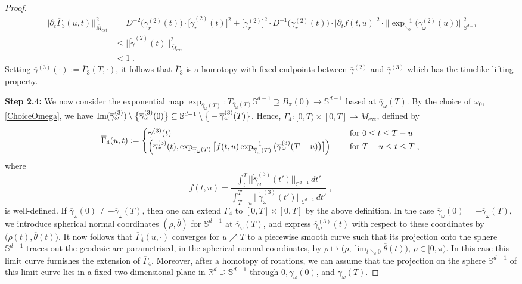 \documentclass[reqno]{article}
\newcommand{\R}{\mathbb{R}}
\newcommand{\Sd}{\mathbb{S}^{d-1}}
\newcommand{\ovg}{\overline{\gamma}}
\newcommand{\oMe}{\overline{M}_\mathrm{ext}}
\begin{document}
\begin{proof}
\begin{equation*}
\begin{split}
||\partial_t\overline{\Gamma}_3(u,t) ||^2_{\oMe} &= D^{-2}\big(\ovg^{(2)}_r(t)\big) \cdot  \big[ \dot{\ovg}_r^{(2)}(t)\big]^2 + \big[\ovg_r^{(2)}\big]^2 \cdot D^{-1}\big(\ovg_r^{(2)}(t)\big) \cdot |\partial_t f(t,u)|^2 \cdot ||\exp^{-1}_{\omega_0}\big( \ovg^{(2)}_\omega(u)\big)||^2_{\Sd} \\
&\leq ||\dot{\ovg}^{(2)}(t)||_{\oMe}^2 \\
&< 1 \;.
\end{split}
\end{equation*}
Setting $\ovg^{(3)}(\cdot) := \overline{\Gamma}_3(T,\cdot)$,  it follows that $\overline{\Gamma}_3$ is a homotopy with fixed endpoints between $\ovg^{(2)}$ and $\ovg^{(3)}$ which has the timelike lifting property.
\vspace*{2mm}

\textbf{Step 2.4:} We now consider the exponential map $\exp_{\ovg_\omega(T)} : T_{\ovg_\omega(T)} \Sd \supseteq B_\pi (0) \to \Sd$ based at $\ovg_\omega(T)$. By the choice of $\omega_0$, \eqref{ChoiceOmega}, we have $\mathrm{Im}(\ovg_\omega^{(3)}) \setminus \big{\{} \ovg_\omega^{(3)}(0)\big{\}} \subseteq \Sd \setminus \big{\{} - \ovg_\omega^{(3)}(T)\big{\}}$. Hence, $\overline{\Gamma}_4 : [0,T) \times [0,T] \to \oMe$, defined by
\begin{equation*}
\overline{\Gamma}_4(u,t) := \begin{cases} \ovg^{(3)}(t) &\textnormal{ for } 0 \leq t \leq T-u \\
\Big( \ovg^{(3)}_r (t) , \exp_{\ovg_\omega(T)} \big[ f(t,u) \exp^{-1}_{\ovg_\omega(T)} \big( \ovg_\omega^{(3)} (T-u)\big)\big] \Big) \quad &\textnormal{ for } T- u \leq t \leq T \;, \end{cases}
\end{equation*}
where
\begin{equation*}
f(t,u) = \frac{ \int_t^T || \dot{\ovg}^{(3)}_\omega(t') ||_{\Sd} \, dt'}{ \int_{T-u}^T || \dot{\ovg}_\omega^{(3)}(t')||_{\Sd} \, dt'}\;,
\end{equation*}
is well-defined. If $\ovg_\omega(0) \neq - \ovg_\omega(T)$, then one can extend $\overline{\Gamma}_4$ to $[0,T] \times [0,T]$ by the above definition. In the case $\ovg_\omega(0) = - \ovg_\omega(T)$, we introduce spherical normal coordinates $(\rho, \overline{\theta})$ for $\Sd$ at $\ovg_\omega(T)$, and express $\ovg_\omega^{(3)}(t)$ with respect to these coordinates by $\big(\rho(t), \overline{\theta}(t)\big)$. It now follows that $\overline{\Gamma}_4(u,\cdot)$ converges for $u \nearrow T$ to a piecewise smooth curve such that its projection onto the sphere $\Sd$ traces out the geodesic arc parametrised, in the spherical normal coordinates, by $\rho \mapsto \big(\rho, \lim_{t \searrow 0} \overline{\theta}(t)\big)$, $\rho \in [0,\pi)$. In this case this limit curve furnishes the extension of $\overline{\Gamma}_4$. Moreover, after a homotopy of rotations, we can assume that the projection on the sphere $\Sd$ of this limit curve lies in a fixed two-dimensional plane in $\R^d \supseteq \Sd$ through $0, \ovg_\omega(0)$, and $\ovg_\omega(T)$.


\end{proof}
\end{document}
